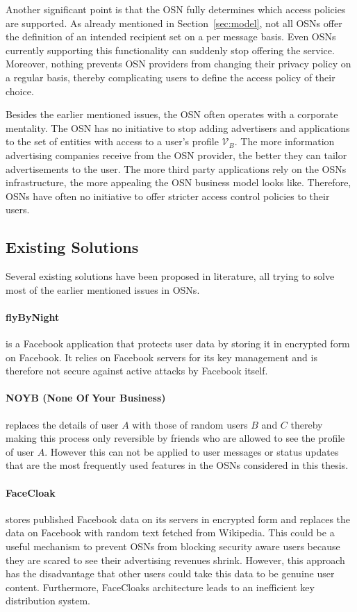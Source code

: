 Another significant point is that the OSN fully determines which access policies are supported. As already mentioned in Section~\ref{sec:model}, not all OSNs offer the definition of an intended recipient set on a per message basis. Even OSNs currently supporting this functionality can suddenly stop offering the service. Moreover, nothing prevents OSN providers from changing their privacy policy on a regular basis, thereby complicating users to define the access policy of their choice.

Besides the earlier mentioned issues, the OSN often operates with a corporate mentality. The OSN has no initiative to stop adding advertisers and applications to the set of entities with access to a user's profile $\mathcal{V}_B$. The more information advertising companies receive from the OSN provider, the better they can tailor advertisements to the user. The more third party applications rely on the OSNs infrastructure, the more appealing the OSN business model looks like. Therefore, OSNs have often no initiative to offer stricter access control policies to their users.

\subsection{Existing Solutions}
\label{sec:existing_solutions}
Several existing solutions have been proposed in literature, all trying to solve most of the earlier mentioned issues in OSNs.

\paragraph{flyByNight~\cite{art:LucasB09}} is a Facebook application that protects user data by storing it in encrypted form on Facebook. It relies on Facebook servers for its key management and is therefore not secure against active attacks by Facebook itself.

\paragraph{NOYB (None Of Your Business)~\cite{art:GuhaSTF08}} replaces the details of user $A$ with those of random users $B$ and $C$ thereby making this process only reversible by friends who are allowed to see the profile of user $A$. However this can not be applied to user messages or status updates that are the most frequently used features in the OSNs considered in this thesis.

\paragraph{FaceCloak~\cite{art:LuoXH09}} stores published Facebook data on its servers in encrypted form and replaces the data on Facebook with random text fetched from Wikipedia. This could be a useful mechanism to prevent OSNs from blocking security aware users because they are scared to see their advertising revenues shrink. However, this approach has the disadvantage that other users could take this data to be genuine user content. Furthermore, FaceCloaks architecture leads to an inefficient key distribution system.

